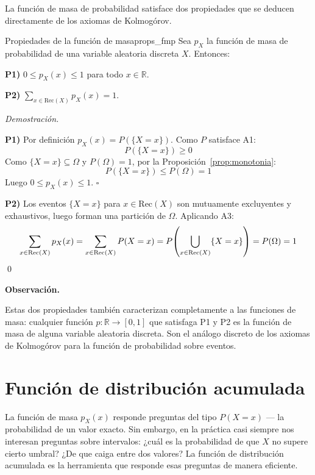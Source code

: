 \documentclass[12pt, a4paper]{book}
\newenvironment{observacion}{%
    \par\medskip\noindent\textbf{\color{azul}Observaci\'{o}n.}\enspace\itshape
}{\par\medskip}
\renewenvironment{proof}{%
    \par\medskip\noindent\textit{Demostraci\'{o}n.}\enspace
}{\qed\par\medskip}
\numberwithin{equation}{chapter}
\begin{document}
La función de masa de probabilidad satisface dos propiedades que se 
deducen directamente de los axiomas de Kolmogórov.

\begin{proposicion}{Propiedades de la función de masa}{props_fmp}
	Sea $p_X$ la función de masa de probabilidad de una variable 
	aleatoria discreta $X$. Entonces:
	
	\medskip
	\noindent\textbf{P1)} $0 \leq p_X(x) \leq 1$ para todo 
	$x \in \mathbb{R}$.
	
	\medskip
	\noindent\textbf{P2)} $\displaystyle\sum_{x \in \text{Rec}(X)} 
	p_X(x) = 1$.
\end{proposicion}

\begin{proof}
	\textbf{P1)} Por definición $p_X(x) = P(\{X = x\})$. Como $P$ 
	satisface A1:
	\[
	P(\{X = x\}) \geq 0
	\]
	Como $\{X = x\} \subseteq \Omega$ y $P(\Omega) = 1$, por la 
	Proposición~\ref{prop:monotonia}:
	\[
	P(\{X = x\}) \leq P(\Omega) = 1
	\]
	Luego $0 \leq p_X(x) \leq 1$. \hfill$\square$
	
	\medskip
	\textbf{P2)} Los eventos $\{X = x\}$ para $x \in \text{Rec}(X)$ 
	son mutuamente excluyentes y exhaustivos, luego forman una 
	partición de $\Omega$. Aplicando A3:
	\[
	\sum_{x \in \text{Rec}(X)} p_X(x) 
	= \sum_{x \in \text{Rec}(X)} P(X = x)
	= P\!\left(\bigcup_{x \in \text{Rec}(X)} \{X = x\}\right)
	= P(\Omega) = 1 \qedhere
	\]
\end{proof}

\begin{observacion}
	Estas dos propiedades también caracterizan completamente a las 
	funciones de masa: cualquier función $p: \mathbb{R} \to [0,1]$ que 
	satisfaga P1 y P2 es la función de masa de alguna variable 
	aleatoria discreta. Son el análogo discreto de los axiomas de 
	Kolmogórov para la función de probabilidad sobre eventos.
\end{observacion}

\section{Funci\'{o}n de distribuci\'{o}n acumulada}


La función de masa $p_X(x)$ responde preguntas del tipo $P(X = x)$ — 
la probabilidad de un valor exacto. Sin embargo, en la práctica casi 
siempre nos interesan preguntas sobre intervalos: ¿cuál es la 
probabilidad de que $X$ no supere cierto umbral? ¿De que caiga entre 
dos valores? La función de distribución acumulada es la herramienta 
que responde esas preguntas de manera eficiente.
\end{document}
